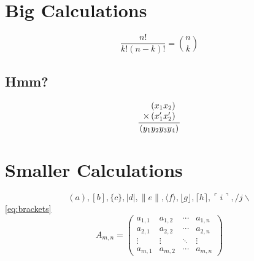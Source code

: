 \documentclass[authoryear]{tex/labreport}
\begin{document}
\section{Big Calculations}
\label{appx:calc}
\begin{equation}
\frac{n!}{k!(n-k)!} = \binom{n}{k}
\end{equation}
\subsection{Hmm?}
\label{subappx:hmm}
\begin{equation}
    \frac{
        \begin{array}[b]{r}
          \left( x_1 x_2 \right)\\
          \times \left( x'_1 x'_2 \right)
        \end{array}
      }{
        \left( y_1y_2y_3y_4 \right)
      }
\end{equation}
\section{Smaller Calculations}
\label{appx:small}
\begin{equation}
        ( a ), [ b ], \{ c \}, | d |, \| e \|,
\langle f \rangle, \lfloor g \rfloor,
\lceil h \rceil, \ulcorner i \urcorner,
/ j \backslash\label{eq:brackets}
    \end{equation}
    \cref{eq:brackets}
\begin{equation}
    A_{m,n} = 
 \begin{pmatrix}
  a_{1,1} & a_{1,2} & \cdots & a_{1,n} \\
  a_{2,1} & a_{2,2} & \cdots & a_{2,n} \\
  \vdots  & \vdots  & \ddots & \vdots  \\
  a_{m,1} & a_{m,2} & \cdots & a_{m,n} 
 \end{pmatrix}
\end{equation}
\end{document}
